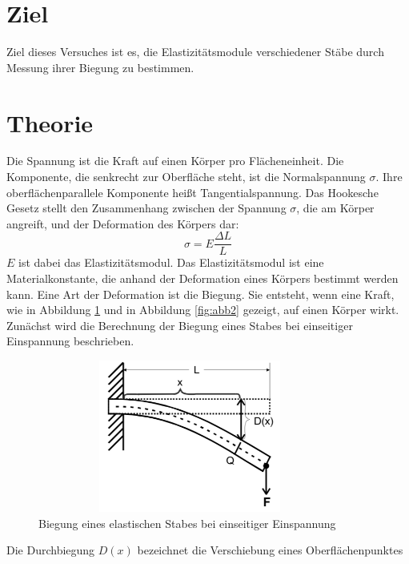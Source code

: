 

\maketitle
\tableofcontents
\newpage
\section{Ziel}
Ziel dieses Versuches ist es, die Elastizitätsmodule
verschiedener Stäbe durch Messung ihrer Biegung
zu bestimmen.
\section{Theorie}
Die Spannung ist die Kraft auf einen Körper pro Flächeneinheit.
Die Komponente, die senkrecht zur Oberfläche steht,
ist die Normalspannung $\sigma$. Ihre oberflächenparallele
Komponente heißt Tangentialspannung.
Das Hookesche Gesetz stellt den Zusammenhang zwischen
der Spannung $\sigma$, die am Körper angreift, und der
Deformation des Körpers dar:
\begin{equation}
\sigma = E \frac{\Delta L}{L}
\label{eqn:Hooke}
\end{equation}
$E$ ist dabei das Elastizitätsmodul.
Das Elastizitätsmodul ist eine Materialkonstante, die
anhand der Deformation eines Körpers bestimmt werden kann.
Eine Art der Deformation ist die Biegung. Sie entsteht, wenn
eine Kraft, wie in Abbildung \ref{fig:abb1} und in Abbildung \ref{fig:abb2} gezeigt, auf einen Körper wirkt.
Zunächst wird die Berechnung der Biegung eines Stabes bei einseitiger
Einspannung beschrieben.
\begin{figure}
    \centering
\includegraphics[width= 10cm, height= 5cm]{./plots/abb1.png}
\caption{Biegung eines elastischen Stabes bei einseitiger Einspannung}
\label{fig:abb1}
\end{figure}
Die Durchbiegung $D(x)$ bezeichnet die Verschiebung eines Oberflächenpunktes
